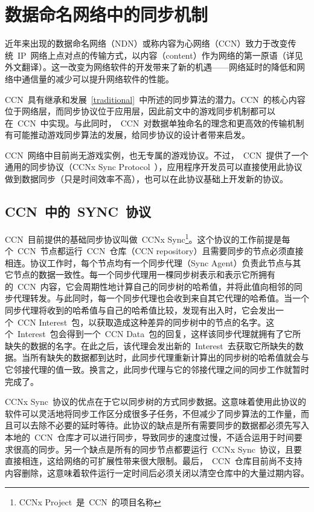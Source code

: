 
\section{数据命名网络中的同步机制}
\label{innovative}

近年来出现的数据命名网络（NDN）或称内容为心网络（CCN）致力于改变传统~IP~网络上点对点的传输方式，以内容（content）作为网络的第一原语（详见外文翻译）。这一改变为网络软件的开发带来了新的机遇——网络延时的降低和网络中通信量的减少可以提升网络软件的性能。

CCN~具有继承和发展~\ref{traditional}~中所述的同步算法的潜力。CCN~的核心内容位于网络层，而同步协议位于应用层，因此前文中的游戏同步机制都可以在~CCN~中实现。与此同时，~CCN~对数据单独命名的理念和更高效的传输机制有可能推动游戏同步算法的发展，给同步协议的设计者带来启发。

CCN~网络中目前尚无游戏实例，也无专属的游戏协议。不过，~CCN~提供了一个通用的同步协议（CCNx Sync Protocol~\cite{CCNxSync}），应用程序开发员可以直接使用此协议做到数据同步（只是时间效率不高），也可以在此协议基础上开发新的协议。


\subsection{CCN~中的~SYNC~协议}

CCN~目前提供的基础同步协议叫做~CCNx Sync\footnote{CCNx Project~是~CCN~的项目名称}。这个协议的工作前提是每个~CCN~节点都运行~CCN~仓库（CCN repository）且需要同步的节点必须直接相连。协议工作时，每个节点均有一个同步代理（Sync Agent）负责此节点与其它节点的数据一致性。每一个同步代理用一棵同步树表示和表示它所拥有的~CCN~内容，它会周期性地计算自己的同步树的哈希值，并将此值向相邻的同步代理转发。与此同时，每一个同步代理也会收到来自其它代理的哈希值。当一个同步代理将收到的哈希值与自己的哈希值比较，发现有出入时，它会发出一个~CCN Interest~包，以获取造成这种差异的同步树中的节点的名字。这个~Interest~包会得到一个~CCN Data~包的回复，这样该同步代理就拥有了它所缺失的数据的名字。在此之后，该代理会发出新的~Interest~去获取它所缺失的数据。当所有缺失的数据都到达时，此同步代理重新计算出的同步树的哈希值就会与它邻接代理的值一致。换言之，此同步代理与它的邻接代理之间的同步工作就暂时完成了。

CCNx Sync~协议的优点在于它以同步树的方式同步数据。这意味着使用此协议的软件可以灵活地将同步工作区分成很多子任务，不但减少了同步算法的工作量，而且可以去除不必要的延时等待。此协议的缺点是所有需要同步的数据都必须先写入本地的~CCN~仓库才可以进行同步，导致同步的速度过慢，不适合运用于时间要求很高的同步。另一个缺点是所有的同步节点都要运行~CCNx Sync~协议，且要直接相连，这给网络的可扩展性带来很大限制。最后，~CCN~仓库目前尚不支持内容删除，这意味着软件运行一定时间后必须关闭以清空仓库中的大量过期内容。

